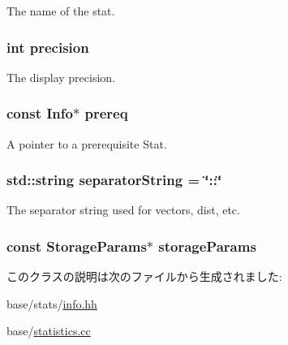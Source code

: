 \label{classStats_1_1Info_a9b45b3e13bd9167aab02e17e08916231}
The name of the stat. \hypertarget{classStats_1_1Info_aa95455ed52a8459fad69509a4a0411b5}{
\subsubsection[{precision}]{\setlength{\rightskip}{0pt plus 5cm}int {\bf precision}}}
\label{classStats_1_1Info_aa95455ed52a8459fad69509a4a0411b5}
The display precision. \hypertarget{classStats_1_1Info_ab085d73a3716bb962a1fa584dd66d1b1}{
\subsubsection[{prereq}]{\setlength{\rightskip}{0pt plus 5cm}const {\bf Info}$\ast$ {\bf prereq}}}
\label{classStats_1_1Info_ab085d73a3716bb962a1fa584dd66d1b1}
A pointer to a prerequisite Stat. \hypertarget{classStats_1_1Info_a8dd294195175788a5d03db3d317a37df}{
\subsubsection[{separatorString}]{\setlength{\rightskip}{0pt plus 5cm}std::string {\bf separatorString} = \char`\"{}::\char`\"{}}}
\label{classStats_1_1Info_a8dd294195175788a5d03db3d317a37df}
The separator string used for vectors, dist, etc. \hypertarget{classStats_1_1Info_ac424134f2732c6004c0f3cdd70e6f354}{
\subsubsection[{storageParams}]{\setlength{\rightskip}{0pt plus 5cm}const {\bf StorageParams}$\ast$ {\bf storageParams}}}
\label{classStats_1_1Info_ac424134f2732c6004c0f3cdd70e6f354}


このクラスの説明は次のファイルから生成されました:\begin{DoxyCompactItemize}
\item 
base/stats/\hyperlink{info_8hh}{info.hh}\item 
base/\hyperlink{statistics_8cc}{statistics.cc}\end{DoxyCompactItemize}
